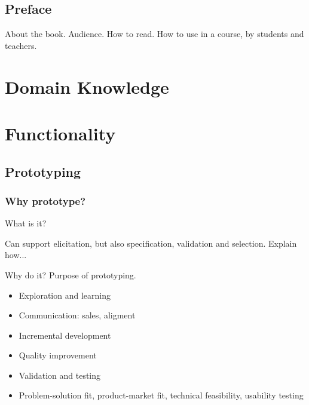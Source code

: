 \documentclass{reqengbook}
\begin{document}
\setcounter{chapter}{-1}
\begin{multicols*}{2}  %
\chapter{Preface}
About the book. Audience. How to read. How to use in a course, by students and teachers.
\end{multicols*}


\pagebreak


\part{Domain Knowledge}  %






\part{Functionality}  %






\chapter{Prototyping}

\section{Why prototype?}

What is it?

Can support elicitation, but also specification, validation and selection. Explain how...

Why do it? Purpose of prototyping.

\begin{itemize}
  \item Exploration and learning
  \item Communication: sales, aligment
  \item Incremental development
  \item Quality improvement
  \item Validation and testing
  \item Problem-solution fit, product-market fit, technical feasibility, usability testing
\end{itemize}
\end{document}
